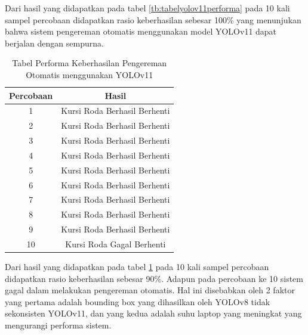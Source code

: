 Dari hasil yang didapatkan pada tabel \ref{tb:tabelyolov11performa} pada 10 kali sampel percobaan didapatkan rasio keberhasilan sebesar 100\% yang menunjukan bahwa sistem pengereman otomatis menggunakan model YOLOv11 dapat berjalan dengan sempurna.

\begin{table}[H]
  \centering
  \caption{Tabel Performa Keberhasilan Pengereman Otomatis menggunakan YOLOv11}
  \label{tb:tabelyolov8performa}
  \begin{tabular}{|c|c|}
    \hline
    Percobaan & Hasil                                                \\ \hline
    1         & \cellcolor[HTML]{34FF34}Kursi Roda Berhasil Berhenti \\ \hline
    2         & \cellcolor[HTML]{34FF34}Kursi Roda Berhasil Berhenti \\ \hline
    3         & \cellcolor[HTML]{34FF34}Kursi Roda Berhasil Berhenti \\ \hline
    4         & \cellcolor[HTML]{34FF34}Kursi Roda Berhasil Berhenti \\ \hline
    5         & \cellcolor[HTML]{34FF34}Kursi Roda Berhasil Berhenti \\ \hline
    6         & \cellcolor[HTML]{34FF34}Kursi Roda Berhasil Berhenti \\ \hline
    7         & \cellcolor[HTML]{34FF34}Kursi Roda Berhasil Berhenti \\ \hline
    8         & \cellcolor[HTML]{34FF34}Kursi Roda Berhasil Berhenti \\ \hline
    9         & \cellcolor[HTML]{34FF34}Kursi Roda Berhasil Berhenti \\ \hline
    10        & \cellcolor[HTML]{FD6864}Kursi Roda Gagal Berhenti    \\ \hline
    \end{tabular}
  \end{table}

Dari hasil yang didapatkan pada tabel \ref{tb:tabelyolov8performa} pada 10 kali sampel percobaan didapatkan rasio keberhasilan sebesar 90\%. Adapun pada percobaan ke 10 sistem gagal dalam melakukan pengereman otomatis. Hal ini disebabkan oleh 2 faktor yang pertama adalah bounding box yang dihasilkan oleh YOLOv8 tidak sekonsisten YOLOv11, dan yang kedua adalah suhu laptop yang meningkat yang mengurangi performa sistem.

